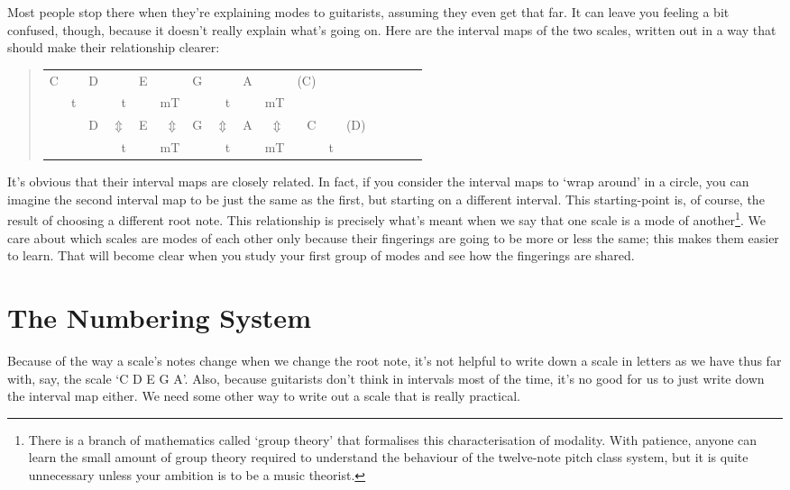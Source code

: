\documentclass[english]{./gbook}
\begin{document}
\begin{large}
Most people stop there when they're explaining modes to guitarists, assuming they even get that far. It can leave you feeling a bit confused, though, because it doesn't really explain what's going on. Here are the interval maps of the two scales, written out in a way that should make their relationship clearer:
\begin{quote}
\begin{tabular}{rrrrrrrrrrrrrrrrr}
	C &&D &&E &&G &&A &&(C)&& \\
		&t && t&&mT &&t &&mT & &&\\
	&&D &$\Updownarrow$&E &$\Updownarrow$&G &$\Updownarrow$&A &$\Updownarrow$&C && (D) \\
		&  && t &&mT &&t &&mT && t 
\end{tabular}
\end{quote}
It's obvious that their interval maps are closely related. In fact, if you consider the interval maps to `wrap around' in a circle, you can imagine the second interval map to be just the same as the first, but starting on a different interval. This starting-point is, of course, the result of choosing a different root note. This relationship is precisely what's meant when we say that one scale is a mode of another\footnote{There is a branch of mathematics called `group theory' that formalises this characterisation of modality. With patience, anyone can learn the small amount of group theory required to understand the behaviour of the twelve-note pitch class system, but it is quite unnecessary unless your ambition is to be a music theorist.}. We care about which scales are modes of each other only because their fingerings are going to be more or less the same; this makes them easier to learn. That will become clear when you study your first group of modes and see how the fingerings are shared.

\section*{The Numbering System}

Because of the way a scale's notes change when we change the root note, it's not helpful to write down a scale in letters as we have thus far with, say, the scale `C D E G A'. Also, because guitarists don't think in intervals most of the time, it's no good for us to just write down the interval map either. We need some other way to write out a scale that is really practical.


\end{large}
\end{document}

